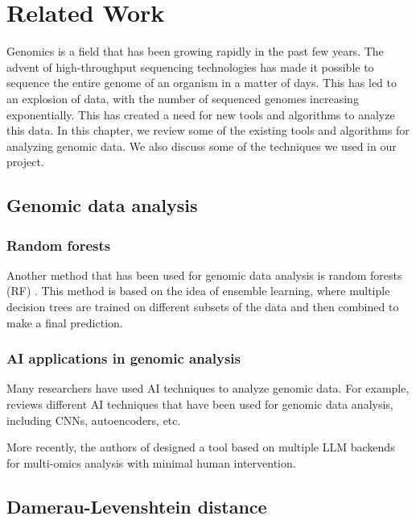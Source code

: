 \chapter{Related Work}
\label{chap:related-work}

Genomics is a field that has been growing rapidly in the past few years. The advent of high-throughput
sequencing technologies has made it possible to sequence the entire genome of an organism in a matter
of days. This has led to an explosion of data, with the number of sequenced genomes increasing exponentially.
This has created a need for new tools and algorithms to analyze this data. In this chapter, we review
some of the existing tools and algorithms for analyzing genomic data. We also discuss some of the techniques
we used in our project.

\section{Genomic data analysis}
\label{sec:genomic-data-analysis}

\subsection*{Random forests}
\label{subsec:random-forests}

Another method that has been used for genomic data analysis is random forests (RF) \cite{Chen-Ishwaran-2012}.
This method is based on the idea of ensemble learning, where multiple decision trees are trained on different
subsets of the data and then combined to make a final prediction.

\subsection*{AI applications in genomic analysis}
\label{sec:ai-applications-in-genomic-analysis}

Many researchers have used AI techniques to analyze genomic data. For example, \cite{Caudai-et-al-2021} reviews
different AI techniques that have been used for genomic data analysis, including CNNs, autoencoders, etc.

More recently, the authors of \cite{Zhou-et-al-2024} designed a tool based on multiple LLM backends for multi-omics
analysis with minimal human intervention.

\section{Damerau-Levenshtein distance}
\label{sec:damerau-levenshtein-distance}

